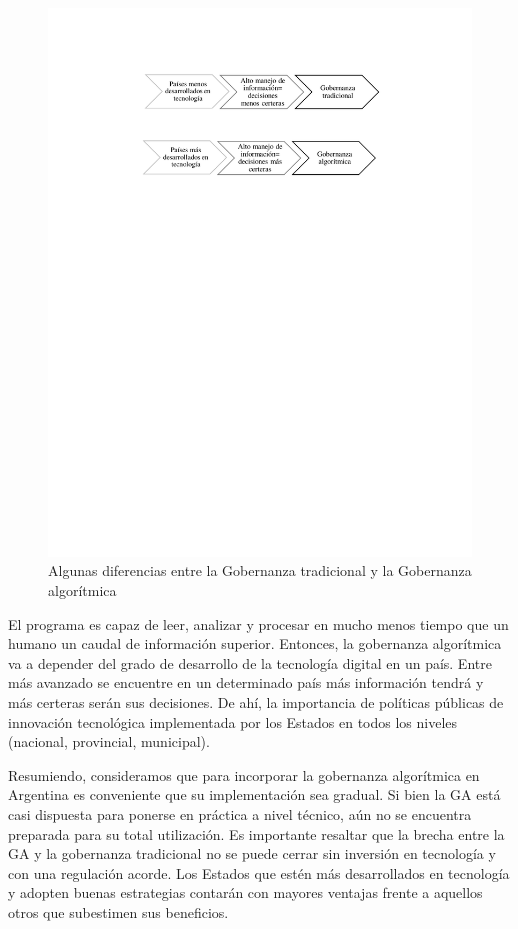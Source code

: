 \documentclass[12pt]{report} %
\begin{document}
\begin{figure}
\centering
\includegraphics[width=0.85\columnwidth]{imagenes/dosflechas.pdf}
\caption{ Algunas diferencias entre la Gobernanza tradicional y la Gobernanza algorítmica}
\label{dosflechas}
\end{figure} 

El programa es capaz de leer, analizar y procesar en mucho menos tiempo que un humano un caudal de información superior. Entonces, la gobernanza algorítmica va a depender del grado de desarrollo de la tecnología digital en un país. Entre más avanzado se encuentre en un determinado país más información tendrá y más certeras serán sus decisiones. De ahí, la importancia de políticas públicas de innovación tecnológica implementada por los Estados en todos los niveles (nacional, provincial, municipal). 

Resumiendo, consideramos que para incorporar la gobernanza algorítmica en Argentina es conveniente que su implementación sea gradual. Si bien la GA está casi dispuesta para ponerse en práctica a nivel técnico, aún no se encuentra preparada para su total utilización. Es importante resaltar que la brecha entre la GA y la gobernanza tradicional no se puede cerrar sin inversión en tecnología y con una regulación acorde. Los Estados que estén más desarrollados en tecnología y adopten buenas estrategias contarán con mayores ventajas frente a aquellos otros que subestimen sus beneficios.
\end{document}
